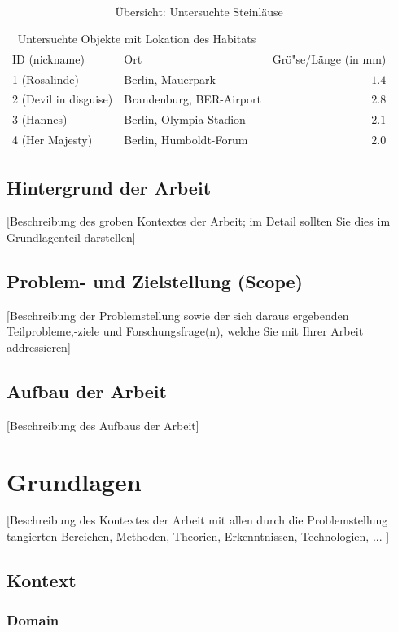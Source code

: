 \documentclass[oneside,bibliography=totocnumbered,BCOR=5mm]{scrbook}
\begin{document}
\begin{table}
\caption{\"Ubersicht: Untersuchte Steinl\"ause}
\centering
\begin{tabular}{llr}
\toprule
\multicolumn{2}{c}{Untersuchte Objekte mit Lokation des Habitats} \\
\cmidrule(r){1-2}
ID (nickname) & Ort & Gr\"o"se/L\"ange (in mm) \\
\midrule
1 (Rosalinde) & Berlin, Mauerpark & $1.4$ \\
2 (Devil in disguise) & Brandenburg, BER-Airport & $2.8$ \\
3 (Hannes) & Berlin, Olympia-Stadion & $2.1$ \\
4 (Her Majesty) & Berlin, Humboldt-Forum & $2.0$ \\
\bottomrule
\end{tabular}
\end{table}

\section{Hintergrund der Arbeit}
[Beschreibung des groben Kontextes der Arbeit; im Detail sollten Sie dies im Grundlagenteil darstellen]


\section{Problem- und Zielstellung (Scope)}
[Beschreibung der Problemstellung sowie der sich daraus ergebenden Teilprobleme,-ziele und Forschungsfrage(n), welche Sie mit Ihrer Arbeit addressieren]


\section{Aufbau der Arbeit}
[Beschreibung des Aufbaus der Arbeit]


\chapter{Grundlagen}
[Beschreibung des Kontextes der Arbeit mit allen durch die Problemstellung tangierten Bereichen, Methoden, Theorien, Erkenntnissen, Technologien, ... ]


\section{Kontext}


\subsection{Domain}
\end{document}
